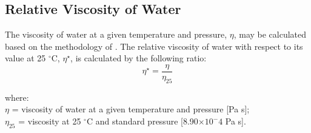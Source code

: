 \subsection{Relative Viscosity of Water}
\label{sec:eta}
The viscosity of water at a given temperature and pressure, $\eta$, may be calculated based on the methodology of \cite{huber09}. 
The relative viscosity of water with respect to its value at 25 ${}^\circ$C, $\eta^\star$, is calculated by the following ratio:
%
\begin{equation}
\label{eq:ns}
    \eta^\star = \frac{\eta}{\eta_{25}}
\end{equation}

\noindent where:\\
\indent $\eta$ = viscosity of water at a given temperature and pressure [Pa s];\\
\indent $\eta_{25}$ = viscosity at 25 ${}^\circ$C and standard pressure [8.90$\times 10^-4$ Pa s].\\

